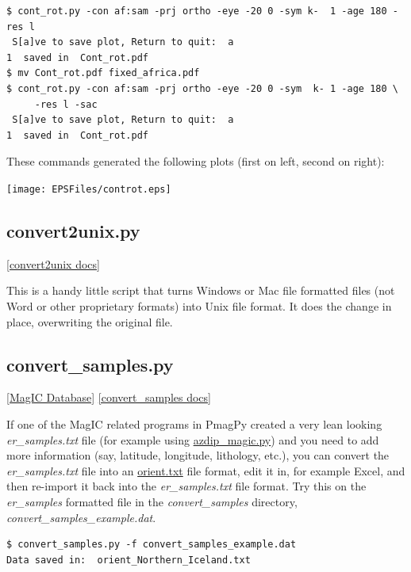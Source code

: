 \documentclass[11pt]{book}
\begin{document}
{{{\begin{verbatim}
$ cont_rot.py -con af:sam -prj ortho -eye -20 0 -sym k-  1 -age 180 -res l
 S[a]ve to save plot, Return to quit:  a
1  saved in  Cont_rot.pdf
$ mv Cont_rot.pdf fixed_africa.pdf
$ cont_rot.py -con af:sam -prj ortho -eye -20 0 -sym  k- 1 -age 180 \
     -res l -sac
 S[a]ve to save plot, Return to quit:  a
1  saved in  Cont_rot.pdf
\end{verbatim}

These commands generated the following plots (first on left, second on right):

{%
\hskip 1cm %
\texttt{[image: EPSFiles/controt.eps]}}

\subsection{convert2unix.py}
\href{https://github.com/PmagPy/PmagPy/blob/master/programs/convert2unix.py}{[convert2unix docs]}

This is a handy little script that turns Windows or Mac file formatted files (not Word or other proprietary formats) into Unix file format.  It does the change in place, overwriting the original file.

\subsection{convert\_samples.py}
\href{#MagICDatabase}{[MagIC Database]}
\href{https://github.com/PmagPy/PmagPy/blob/master/programs/convert_samples.py}{[convert\_samples docs]}

If one of the MagIC related programs in PmagPy created a very lean looking {\it er\_samples.txt} file (for example using \href{#azdip_magic.py}{azdip\_magic.py}) and you need to add more information (say, latitude, longitude, lithology, etc.), you can convert the {\it er\_samples.txt} file into an \href{#orientation_magic.py}{orient.txt} file format, edit it in, for example Excel, and then re-import it back into the {\it er\_samples.txt} file format.  Try this on the {\it er\_samples} formatted file in the {\it convert\_samples} directory, {\it convert\_samples\_example.dat}.

\begin{verbatim}
$ convert_samples.py -f convert_samples_example.dat
Data saved in:  orient_Northern_Iceland.txt
\end{verbatim}




}}}
\end{document}

